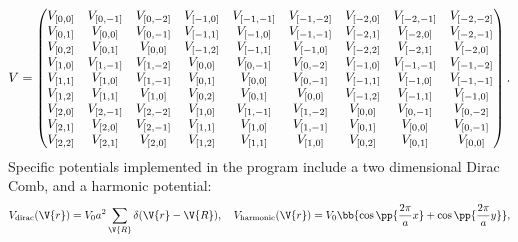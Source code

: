 \documentclass[main.tex]{subfiles}
\begin{document}
	\begin{equation}
		V = \begin{pmatrix}
			V_{[0, 0]}	& V_{[0, -1]}	& V_{[0, -2]}	& V_{[-1, 0]}		& V_{[-1, -1]}	& V_{[-1, -2]}	& V_{[-2, 0]}	& V_{[-2, -1]}	& V_{[-2, -2]} \\
			
			V_{[0, 1]}	& V_{[0, 0]}	& V_{[0, -1]}	& V_{[-1, 1]}		& V_{[-1, 0]}		& V_{[-1, -1]}	& V_{[-2, 1]}	& V_{[-2, 0]}		& V_{[-2, -1]} \\
			
			V_{[0, 2]}	& V_{[0, 1]}	& V_{[0, 0]}	& V_{[-1, 2]}		& V_{[-1, 1]} 	& V_{[-1, 0]}	& V_{[-2, 2]}	& V_{[-2, 1]}		& V_{[-2, 0]} \\
			
			V_{[1, 0]}	& V_{[1, -1]}	& V_{[1, -2]}	& V_{[0, 0]}		& V_{[0, -1]}		& V_{[0, -2]}	& V_{[-1, 0]}	& V_{[-1, -1]}	& V_{[-1, -2]} \\
			
			V_{[1, 1]} 	& V_{[1, 0]}	& V_{[1, -1]}	& V_{[0, 1]}		& V_{[0, 0]}		& V_{[0,-1]}	& V_{[-1, 1]}	& V_{[-1, 0]}		& V_{[-1, -1]} \\
			
			V_{[1, 2]}	& V_{[1, 1]}	& V_{[1, 0]}	& V_{[0, 2]}		& V_{[0, 1]}		& V_{[0, 0]}	& V_{[-1, 2]}	& V_{[-1, 1]}		& V_{[-1, 0]} \\
			
			V_{[2, 0]}	& V_{[2, -1]}	& V_{[2, -2]}	& V_{[1, 0]}		& V_{[1, -1]}		& V_{[1, -2]}	& V_{[0, 0]}	& V_{[0, -1]}		& V_{[0, -2]} \\
			
			V_{[2, 1]}	& V_{[2, 0]}	& V_{[2, -1]}	& V_{[1, 1]}		& V_{[1, 0]}		& V_{[1, -1]}	& V_{[0, 1]}	& V_{[0, 0]}		& V_{[0, -1]} \\
			
			V_{[2, 2]}	& V_{[2, 1]}	& V_{[2, 0]}	& V_{[1, 2]}		& V_{[1, 1]}		& V_{[1, 0]}	& V_{[0, 2]}	& V_{[0, 1]}		& V_{[0, 0]}
		\end{pmatrix}.
	\end{equation}
	Specific potentials implemented in the program include a two dimensional Dirac Comb, and a harmonic potential:
	\begin{equation}
		V_{\text{dirac}}(\V{r}) = V_0 a^2 \sum_{\V{R}} \delta(\V{r}-\V{R}), \quad V_{\text{harmonic}}(\V{r}) = V_0 \bb{\cos\pp{\frac{2\pi}{a} x} + \cos\pp{\frac{2\pi}{a} y}},
	\end{equation}
\end{document}
